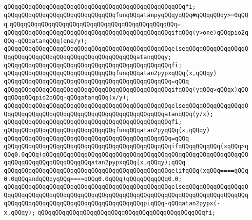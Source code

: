 \verb|qQQqqQQqqQQqqQQqqQQqqQQqqQQqqQQqqQQqqQQqqQQqqQQqqQQqfi;|\newline
\newline
\verb|qQQqqQQqqQQqqQQqqQQqqQQqqQQqqQQqfunqQQqatanpyqQQqyqQQq#qQQqqQQqy>=0qQQq|\newline
\verb|qQQqqQQqqQQqqQQqqQQqqQQqqQQqqQQqqQQqqQQqqQQqqQQq=|\newline
\verb|qQQqqQQqqQQqqQQqqQQqqQQqqQQqqQQqqQQqqQQqqQQqqQQqifqQQq(y>one)qQQqpio2qQQq-qQQqatanqQQq(one/y);|\newline
\verb|qQQqqQQqqQQqqQQqqQQqqQQqqQQqqQQqqQQqqQQqqQQqqQQqelseqQQqqQQqqQQqqQQqqQQqqQQqqQQqqQQqqQQqqQQqqQQqqQQqqQQqqQQqatanqQQqy;|\newline
\verb|qQQqqQQqqQQqqQQqqQQqqQQqqQQqqQQqqQQqqQQqqQQqqQQqfi;|\newline
\newline
\verb|qQQqqQQqqQQqqQQqqQQqqQQqqQQqqQQqfunqQQqatan2pypxqQQq(x,qQQqy)|\newline
\verb|qQQqqQQqqQQqqQQqqQQqqQQqqQQqqQQqqQQqqQQqqQQqqQQq=qQQq|\newline
\verb|qQQqqQQqqQQqqQQqqQQqqQQqqQQqqQQqqQQqqQQqqQQqqQQqifqQQq(yqQQq>qQQqx)qQQqqQQqqQQqpio2qQQq-qQQqatanqQQq(x/y);|\newline
\verb|qQQqqQQqqQQqqQQqqQQqqQQqqQQqqQQqqQQqqQQqqQQqqQQqelseqQQqqQQqqQQqqQQqqQQqqQQqqQQqqQQqqQQqqQQqqQQqqQQqqQQqqQQqqQQqqQQqatanqQQq(y/x);|\newline
\verb|qQQqqQQqqQQqqQQqqQQqqQQqqQQqqQQqqQQqqQQqqQQqqQQqfi;|\newline
\newline
\verb|qQQqqQQqqQQqqQQqqQQqqQQqqQQqqQQqfunqQQqatan2pyqQQq(x,qQQqy)|\newline
\verb|qQQqqQQqqQQqqQQqqQQqqQQqqQQqqQQqqQQqqQQqqQQqqQQq=qQQq|\newline
\verb|qQQqqQQqqQQqqQQqqQQqqQQqqQQqqQQqqQQqqQQqqQQqqQQqifqQQqqQQqqQQq(xqQQq>qQQq0.0qQQq)qQQqqQQqqQQqqQQqqQQqqQQqqQQqqQQqqQQqqQQqqQQqqQQqqQQqqQQqqQQqqQQqqQQqqQQqqQQqqQQqqQQqatan2pypxqQQq(x,qQQqy);qQQq|\newline
\verb|qQQqqQQqqQQqqQQqqQQqqQQqqQQqqQQqqQQqqQQqqQQqqQQqelifqQQq(xqQQq====qQQq0.0qQQqandqQQqyqQQq====qQQq0.0qQQq)qQQqqQQqqQQq0.0;|\newline
\verb|qQQqqQQqqQQqqQQqqQQqqQQqqQQqqQQqqQQqqQQqqQQqqQQqelseqQQqqQQqqQQqqQQqqQQqqQQqqQQqqQQqqQQqqQQqqQQqqQQqqQQqqQQqqQQqqQQqqQQqqQQqqQQqqQQqqQQqqQQqqQQqqQQqqQQqqQQqqQQqqQQqqQQqqQQqqQQqqQQqpiqQQq-qQQqatan2pypx(-x,qQQqy);|\newline
\verb|qQQqqQQqqQQqqQQqqQQqqQQqqQQqqQQqqQQqqQQqqQQqqQQqfi;|\newline
